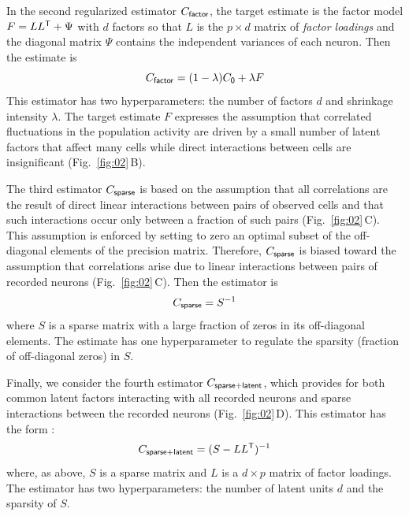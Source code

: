 \documentclass[10pt]{article}
\newcommand{\T}{{\sf T}}
\begin{document}
In the second regularized estimator $C_{\sf factor}$, the target estimate is the factor model $F =  L L^\T + \Psi$ with $d$ factors so that $L$ is the $p\times d$ matrix of \emph{factor loadings} and the diagonal matrix $\Psi$ contains the independent variances of each neuron.
Then the estimate is 
\begin{equation}
C_{\sf factor} = (1-\lambda) C_{\sf 0} + \lambda F
\end{equation}
This estimator has two hyperparameters: the number of factors $d$ and shrinkage intensity $\lambda$. The target estimate $F$ expresses the assumption that correlated fluctuations in the population activity are driven by a small number of latent factors that affect many cells while direct interactions between cells are insignificant (Fig.~\ref{fig:02}\,B).   

The third estimator $C_{\sf sparse}$ is based on the assumption that all correlations are the result of direct linear interactions between pairs of observed cells and that such interactions occur only between a fraction of such pairs (Fig.~\ref{fig:02}\,C).  This assumption is enforced by setting to zero an optimal subset of the off-diagonal elements of the precision matrix.  Therefore, $C_{\sf sparse}$ is biased toward the assumption that correlations arise due to linear interactions between pairs of recorded neurons (Fig.~\ref{fig:02}\,C). Then the estimator is 
\begin{equation}
C_{\sf sparse} = S^{-1}
\end{equation}
where $S$ is a sparse matrix with a large fraction of zeros in its off-diagonal elements. The estimate has one hyperparameter to regulate the sparsity (fraction of off-diagonal zeros) in $S$.

Finally, we consider the fourth estimator $C_{\sf sparse+latent}$, which provides for both common latent factors interacting with all recorded neurons and sparse interactions between the recorded neurons (Fig.~\ref{fig:02}\,D). This estimator has the form \cite{Chandrasekaran:2010,Ma:2013}:
\begin{equation}
C_{\sf sparse+latent} = (S - LL^\T)^{-1}
\end{equation}
where, as above, $S$ is a sparse matrix and $L$ is a $d\times p$ matrix of factor loadings. The estimator has two hyperparameters: the number of latent units $d$ and the sparsity of $S$.
\end{document}
